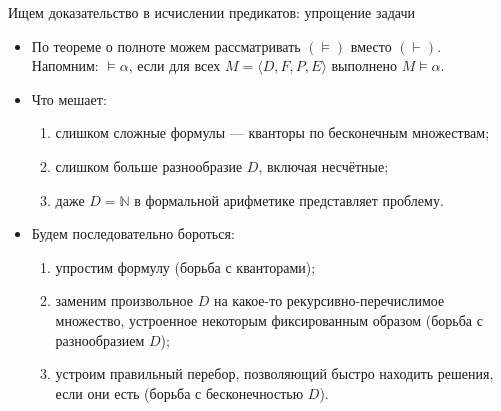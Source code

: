 \documentclass[aspectratio=169]{beamer}
\begin{document}
\begin{frame}{Ищем доказательство в исчислении предикатов: упрощение задачи}

\begin{itemize}
\item По теореме о полноте можем рассматривать $(\models)$ вместо $(\vdash)$. 
Напомним: $\models \alpha$, если для всех $M = \langle D, F, P, E \rangle$ выполнено $M \models \alpha$.\pause
\vspace{0.3cm}

\item Что мешает:
\begin{enumerate}
\item слишком сложные формулы --- кванторы по бесконечным множествам;
\item слишком больше разнообразие $D$, включая несчётные;
\item даже $D = \mathbb{N}$ в формальной арифметике представляет проблему.
\end{enumerate}\pause
\vspace{0.3cm}

\item Будем последовательно бороться:
\begin{enumerate}
\item упростим формулу (борьба с кванторами);
\item заменим произвольное $D$ на какое-то рекурсивно-перечислимое множество, устроенное некоторым фиксированным образом (борьба с разнообразием $D$);
\item устроим правильный перебор, позволяющий быстро находить решения, если они есть (борьба с бесконечностью $D$).
\end{enumerate}
\end{itemize}
\end{frame}
\end{document}
